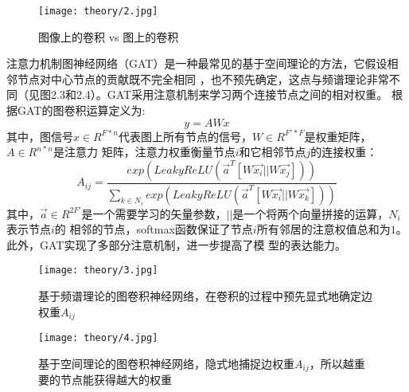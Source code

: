 \begin{figure}[ht]
    \centering
    \texttt{[image: theory/2.jpg]}
    \caption{\label{2-1}图像上的卷积 vs 图上的卷积}
\end{figure}

注意力机制图神经网络（GAT）是一种最常见的基于空间理论的方法，它假设相邻节点对中心节点的贡献既不完全相同
，也不预先确定，这点与频谱理论非常不同（见图2.3和2.4）。GAT采用注意机制来学习两个连接节点之间的相对权重。
根据GAT的图卷积运算定义为:
$$  y = A W x $$
其中，图信号$ x\in R^{F*n} $代表图上所有节点的信号，$ W \in R^{F'*F} $是权重矩阵，$A \in R^{n*n}$是注意力
矩阵，注意力权重衡量节点$i$和它相邻节点$j$的连接权重：
$$
    A_{ij} = \frac{exp(LeakyReLU(\vec{a}^{T}[W\vec{x_{i}}||W\vec{x_{j}}]))}
    { {\textstyle \sum_{k\in N_{i} }^{}} exp(LeakyReLU(\vec{a}^{T}[W\vec{x_{i}}||W\vec{x_{k}}]))}  
$$
其中，$\vec{a} \in R^{2F'}$是一个需要学习的矢量参数，$ || $是一个将两个向量拼接的运算，$ N_{i} $表示节点$i$的
相邻的节点，softmax函数保证了节点$i$所有邻居的注意权值总和为$1$。此外，GAT实现了多部分注意机制，进一步提高了模
型的表达能力。

\begin{figure}[htbp]
    \centering
    \begin{minipage}[t]{0.48\textwidth}
    \centering
    \captionsetup{width=5cm}
    \texttt{[image: theory/3.jpg]}
    \caption{\label{2-3}基于频谱理论的图卷积神经网络，在卷积的过程中预先显式地确定边权重$A_{ij}$}
    \end{minipage}
    \begin{minipage}[t]{0.48\textwidth}
    \centering
    \captionsetup{width=5cm}
    \texttt{[image: theory/4.jpg]}
    \caption{\label{2-4}基于空间理论的图卷积神经网络，隐式地捕捉边权重$A_{ij}$，所以越重要的节点能获得越大的权重}
    \end{minipage}
\end{figure}

